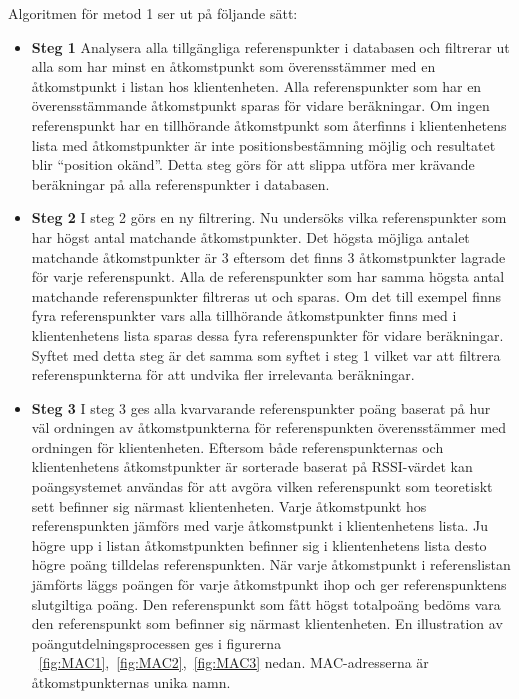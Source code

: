 \documentclass[a4paper,12pt]{article}
\begin{document}
 Algoritmen för metod 1 ser ut på följande sätt:

   \begin{itemize}
     \item \textbf{Steg 1}
     \newline
     Analysera alla tillgängliga referenspunkter i databasen och filtrerar ut alla som har minst en åtkomstpunkt som överensstämmer med en åtkomstpunkt i listan hos klientenheten. Alla referenspunkter som har en överensstämmande åtkomstpunkt sparas för vidare beräkningar. Om ingen referenspunkt har en tillhörande åtkomstpunkt som återfinns i klientenhetens lista med åtkomstpunkter är inte positionsbestämning möjlig och resultatet blir ``position okänd''.
     Detta steg görs för att slippa utföra mer krävande beräkningar på alla referenspunkter i databasen.
     \item \textbf{Steg 2}
     \newline
     I steg 2 görs en ny filtrering. Nu undersöks vilka referenspunkter som har högst antal matchande åtkomstpunkter. Det högsta möjliga antalet matchande åtkomstpunkter är 3 eftersom det finns 3 åtkomstpunkter lagrade för varje referenspunkt. Alla de referenspunkter som har samma högsta antal matchande referenspunkter filtreras ut och sparas.
     Om det till exempel finns fyra referenspunkter vars alla tillhörande åtkomstpunkter finns med i klientenhetens lista sparas dessa fyra referenspunkter för vidare beräkningar. Syftet med detta steg är det samma som syftet i steg 1 vilket var att filtrera referenspunkterna för att undvika fler irrelevanta beräkningar.

     \item \textbf{Steg 3}
     \newline
     I steg 3 ges alla kvarvarande referenspunkter poäng baserat på hur väl ordningen av åtkomstpunkterna för referenspunkten överensstämmer med ordningen för klientenheten. Eftersom både referenspunkternas och klientenhetens åtkomstpunkter är sorterade baserat på RSSI-värdet kan poängsystemet användas för att avgöra vilken referenspunkt som teoretiskt sett befinner sig närmast klientenheten.
     Varje åtkomstpunkt hos referenspunkten jämförs med varje åtkomstpunkt i klientenhetens lista. Ju högre upp i listan åtkomstpunkten befinner sig i klientenhetens lista desto högre poäng tilldelas referenspunkten. När varje åtkomstpunkt i referenslistan jämförts läggs poängen för varje åtkomstpunkt ihop och ger referenspunktens slutgiltiga poäng.
     Den referenspunkt som fått högst totalpoäng bedöms vara den referenspunkt som befinner sig närmast klientenheten.
     En illustration av poängutdelningsprocessen ges i figurerna ~\ref{fig:MAC1},~\ref{fig:MAC2},~\ref{fig:MAC3} nedan.
     MAC-adresserna är åtkomstpunkternas unika namn.


\end{itemize}
\end{document}
